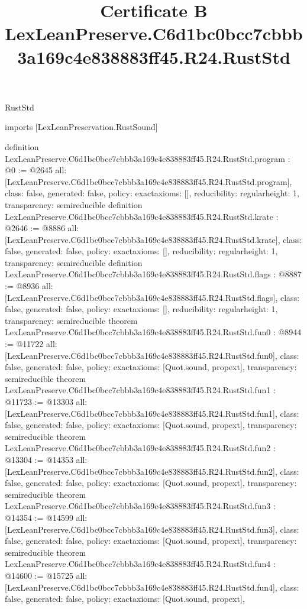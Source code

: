 \begin{lexlean}{RustStd}
\title{Certificate B LexLeanPreserve.C6d1bc0bcc7cbbb3a169c4e838883ff45.R24.RustStd}
\begin{coremodule}
imports [LexLeanPreservation.RustSound]

definition LexLeanPreserve.C6d1bc0bcc7cbbb3a169c4e838883ff45.R24.RustStd.program : @0 := @2645 {
  all: [LexLeanPreserve.C6d1bc0bcc7cbbb3a169c4e838883ff45.R24.RustStd.program],
  class: false,
  generated: false,
  policy: exact{axioms: []},
  reducibility: regular{height: 1},
  transparency: semireducible
}
definition LexLeanPreserve.C6d1bc0bcc7cbbb3a169c4e838883ff45.R24.RustStd.krate : @2646 := @8886 {
  all: [LexLeanPreserve.C6d1bc0bcc7cbbb3a169c4e838883ff45.R24.RustStd.krate],
  class: false,
  generated: false,
  policy: exact{axioms: []},
  reducibility: regular{height: 1},
  transparency: semireducible
}
definition LexLeanPreserve.C6d1bc0bcc7cbbb3a169c4e838883ff45.R24.RustStd.flags : @8887 := @8936 {
  all: [LexLeanPreserve.C6d1bc0bcc7cbbb3a169c4e838883ff45.R24.RustStd.flags],
  class: false,
  generated: false,
  policy: exact{axioms: []},
  reducibility: regular{height: 1},
  transparency: semireducible
}
theorem LexLeanPreserve.C6d1bc0bcc7cbbb3a169c4e838883ff45.R24.RustStd.fun0 : @8944 := @11722 {
  all: [LexLeanPreserve.C6d1bc0bcc7cbbb3a169c4e838883ff45.R24.RustStd.fun0],
  class: false,
  generated: false,
  policy: exact{axioms: [Quot.sound, propext]},
  transparency: semireducible
}
theorem LexLeanPreserve.C6d1bc0bcc7cbbb3a169c4e838883ff45.R24.RustStd.fun1 : @11723 := @13303 {
  all: [LexLeanPreserve.C6d1bc0bcc7cbbb3a169c4e838883ff45.R24.RustStd.fun1],
  class: false,
  generated: false,
  policy: exact{axioms: [Quot.sound, propext]},
  transparency: semireducible
}
theorem LexLeanPreserve.C6d1bc0bcc7cbbb3a169c4e838883ff45.R24.RustStd.fun2 : @13304 := @14353 {
  all: [LexLeanPreserve.C6d1bc0bcc7cbbb3a169c4e838883ff45.R24.RustStd.fun2],
  class: false,
  generated: false,
  policy: exact{axioms: [Quot.sound, propext]},
  transparency: semireducible
}
theorem LexLeanPreserve.C6d1bc0bcc7cbbb3a169c4e838883ff45.R24.RustStd.fun3 : @14354 := @14599 {
  all: [LexLeanPreserve.C6d1bc0bcc7cbbb3a169c4e838883ff45.R24.RustStd.fun3],
  class: false,
  generated: false,
  policy: exact{axioms: [Quot.sound, propext]},
  transparency: semireducible
}
theorem LexLeanPreserve.C6d1bc0bcc7cbbb3a169c4e838883ff45.R24.RustStd.fun4 : @14600 := @15725 {
  all: [LexLeanPreserve.C6d1bc0bcc7cbbb3a169c4e838883ff45.R24.RustStd.fun4],
  class: false,
  generated: false,
  policy: exact{axioms: [Quot.sound, propext]},
}
\end{coremodule}
\end{lexlean}
